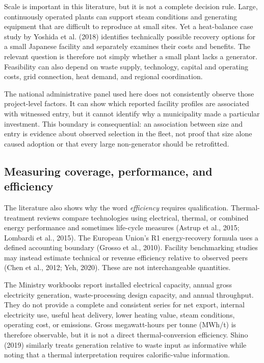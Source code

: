 \documentclass[12pt,a4paper]{article}
\begin{document}
Scale is important in this literature, but it is not a complete decision rule.
Large, continuously operated plants can support steam conditions and generating
equipment that are difficult to reproduce at small sites. Yet a heat-balance case
study by Yoshida et al. (2018) identifies technically possible recovery options
for a small Japanese facility and separately examines their costs and benefits.
The relevant question is therefore not simply whether a small plant lacks a
generator. Feasibility can also depend on waste supply, technology, capital and
operating costs, grid connection, heat demand, and regional coordination.

The national administrative panel used here does not consistently observe those
project-level factors. It can show which reported facility profiles are
associated with witnessed entry, but it cannot identify why a municipality made
a particular investment. This boundary is consequential: an association between
size and entry is evidence about observed selection in the fleet, not proof that
size alone caused adoption or that every large non-generator should be
retrofitted.

\subsection{Measuring coverage, performance, and efficiency}

The literature also shows why the word \emph{efficiency} requires qualification.
Thermal-treatment reviews compare technologies using electrical, thermal, or
combined energy performance and sometimes life-cycle measures (Astrup et al.,
2015; Lombardi et al., 2015). The European Union's R1 energy-recovery formula
uses a defined accounting boundary (Grosso et al., 2010).
Facility benchmarking studies may instead estimate technical or revenue
efficiency relative to observed peers (Chen et al., 2012; Yeh, 2020). These are
not interchangeable quantities.

The Ministry workbooks report installed electrical capacity, annual gross
electricity generation, waste-processing design capacity, and annual throughput.
They do not provide a complete and consistent series for net export, internal
electricity use, useful heat delivery, lower heating value, steam conditions,
operating cost, or emissions. Gross megawatt-hours per tonne (MWh/t) is therefore
observable, but it is not a direct thermal-conversion efficiency. Shino (2019)
similarly treats generation relative to waste input as informative while noting
that a thermal interpretation requires calorific-value information.
\end{document}
